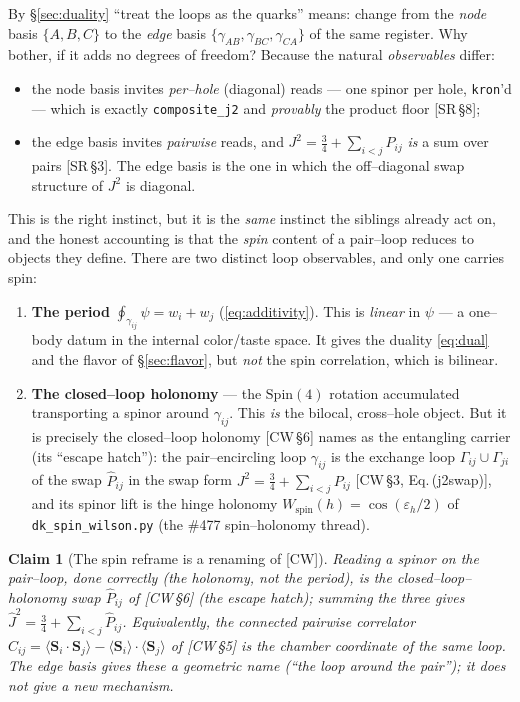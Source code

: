 \documentclass[11pt,oneside]{article}
\newcommand{\expval}[1]{\langle #1 \rangle}
\newcommand{\code}[1]{\texttt{#1}}
\newcommand{\Spin}{\mathrm{Spin}}
\theoremstyle{plain}
\newtheorem{claim}{Claim}
\begin{document}
By \S\ref{sec:duality} ``treat the loops as the quarks'' means: change from the
\emph{node} basis $\{A,B,C\}$ to the \emph{edge} basis
$\{\gamma_{AB},\gamma_{BC},\gamma_{CA}\}$ of the same register. Why bother, if it
adds no degrees of freedom? Because the natural \emph{observables} differ:
\begin{itemize}[leftmargin=1.6em]
  \item the node basis invites \emph{per--hole} (diagonal) reads --- one spinor per
        hole, \code{kron}'d --- which is exactly \code{composite\_j2} and
        \emph{provably} the product floor [SR\,\S8];
  \item the edge basis invites \emph{pairwise} reads, and $J^2=\tfrac34+\sum_{i<j}
        P_{ij}$ \emph{is} a sum over pairs [SR\,\S3]. The edge basis is the one in
        which the off--diagonal swap structure of $J^2$ is diagonal.
\end{itemize}
This is the right instinct, but it is the \emph{same} instinct the siblings
already act on, and the honest accounting is that the \emph{spin} content of a
pair--loop reduces to objects they define. There are two distinct loop
observables, and only one carries spin:
\begin{enumerate}[leftmargin=1.9em]
  \item \textbf{The period} $\oint_{\gamma_{ij}}\psi=w_i+w_j$ (\eqref{eq:additivity}).
        This is \emph{linear} in $\psi$ --- a one--body datum in the internal
        color/taste space. It gives the duality \eqref{eq:dual} and the flavor of
        \S\ref{sec:flavor}, but \emph{not} the spin correlation, which is bilinear.
  \item \textbf{The closed--loop holonomy} --- the $\Spin(4)$ rotation accumulated
        transporting a spinor around $\gamma_{ij}$. This \emph{is} the bilocal,
        cross--hole object. But it is precisely the closed--loop holonomy
        [CW\,\S6] names as the entangling carrier (its ``escape hatch''): the
        pair--encircling loop $\gamma_{ij}$ is the exchange loop
        $\Gamma_{ij}\cup\Gamma_{ji}$ of the swap $\hat P_{ij}$ in the swap form
        $J^2=\tfrac34+\sum_{i<j}P_{ij}$ [CW\,\S3, Eq.\,(j2swap)], and its spinor
        lift is the hinge holonomy $W_{\text{spin}}(h)=\cos(\varepsilon_h/2)$ of
        \code{dk\_spin\_wilson.py} (the \#477 spin--holonomy thread).
\end{enumerate}

\begin{claim}[The spin reframe is a renaming of {[CW]}]
Reading a spinor on the pair--loop, done correctly (the holonomy, not the period),
is the closed--loop--holonomy swap $\hat P_{ij}$ of [CW\,\S6] (the escape hatch);
summing the three gives $\hat J^2=\tfrac34+\sum_{i<j}\hat P_{ij}$. Equivalently, the connected
pairwise correlator $C_{ij}=\expval{\bm S_i\!\cdot\!\bm S_j}-\expval{\bm S_i}\!\cdot\!
\expval{\bm S_j}$ of [CW\,\S5] is the chamber coordinate of the same loop. The
edge basis gives these a \emph{geometric name} (``the loop around the pair''); it
does not give a new mechanism.
\end{claim}
\end{document}
